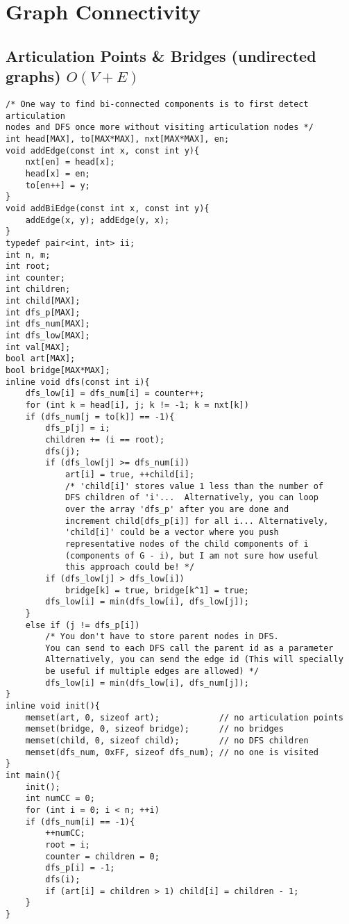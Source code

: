 \documentclass[12pt]{book}
\begin{document}
\chapter{Graph Connectivity}
\section{Articulation Points \& Bridges (undirected graphs) $O(V + E)$}
\begin{verbatim}
/* One way to find bi-connected components is to first detect articulation
nodes and DFS once more without visiting articulation nodes */
int head[MAX], to[MAX*MAX], nxt[MAX*MAX], en;
void addEdge(const int x, const int y){
	nxt[en] = head[x];
	head[x] = en;
	to[en++] = y;
}
void addBiEdge(const int x, const int y){
	addEdge(x, y); addEdge(y, x);
}
typedef pair<int, int> ii;
int n, m;
int root;
int counter;
int children;
int child[MAX];
int dfs_p[MAX];
int dfs_num[MAX];
int dfs_low[MAX];
int val[MAX];
bool art[MAX];
bool bridge[MAX*MAX];
inline void dfs(const int i){
	dfs_low[i] = dfs_num[i] = counter++;
	for (int k = head[i], j; k != -1; k = nxt[k])
	if (dfs_num[j = to[k]] == -1){
		dfs_p[j] = i;
		children += (i == root);
		dfs(j);
		if (dfs_low[j] >= dfs_num[i])
			art[i] = true, ++child[i];
			/* 'child[i]' stores value 1 less than the number of
			DFS children of 'i'...  Alternatively, you can loop
			over the array 'dfs_p' after you are done and
			increment child[dfs_p[i]] for all i... Alternatively,
			'child[i]' could be a vector where you push
			representative nodes of the child components of i
			(components of G - i), but I am not sure how useful
			this approach could be! */
		if (dfs_low[j] > dfs_low[i])
			bridge[k] = true, bridge[k^1] = true;
		dfs_low[i] = min(dfs_low[i], dfs_low[j]);
	}
	else if (j != dfs_p[i])
		/* You don't have to store parent nodes in DFS.
		You can send to each DFS call the parent id as a parameter
		Alternatively, you can send the edge id (This will specially
		be useful if multiple edges are allowed) */
		dfs_low[i] = min(dfs_low[i], dfs_num[j]);
}
inline void init(){
	memset(art, 0, sizeof art);            // no articulation points
	memset(bridge, 0, sizeof bridge);      // no bridges
	memset(child, 0, sizeof child);        // no DFS children
	memset(dfs_num, 0xFF, sizeof dfs_num); // no one is visited
}
int main(){
	init();
	int numCC = 0;
	for (int i = 0; i < n; ++i)
	if (dfs_num[i] == -1){
		++numCC;
		root = i;
		counter = children = 0;
		dfs_p[i] = -1;
		dfs(i);
		if (art[i] = children > 1) child[i] = children - 1;
	}
}
\end{verbatim}
\end{document}
